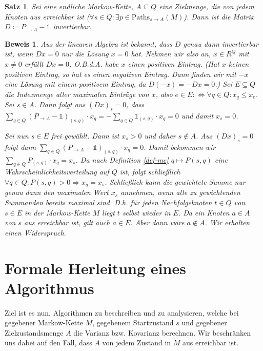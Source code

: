 \documentclass[a4paper]{article}
\newcommand{\mc}{Markow-Kette}
\newtheorem{satz}{Satz}[section] %
\theoremstyle{nonumberplain}
\newtheorem{beweis}{Beweis}
\begin{document}
\begin{satz}\label{th-unique}
	Sei \mcex{} eine endliche \mc, $A\subseteq Q$ eine Zielmenge, die von jedem Knoten aus erreichbar ist ($\forall s\in Q: \exists p \in \mathrm{Paths}_{s\rightarrow A}(M)$). 
	Dann ist die Matrix $D \coloneqq P_{\rightarrow A} - \mathbb{1}$ invertierbar.
\end{satz}
\begin{beweis}
	Aus der linearen Algebra ist bekannt, dass $D$ genau dann invertierbar ist, wenn $Dx = 0$ nur die Lösung $x=0$ hat.
	Nehmen wir also an, $x \in R^Q$ mit $x\neq 0$ erfüllt $Dx = 0$. O.B.d.A. habe $x$ einen positiven Eintrag. (Hat $x$ keinen positiven Eintrag, so hat es einen negativen Eintrag. Dann finden wir mit $-x$ eine Lösung mit einem positivem Eintrag, da $D(-x) = - Dx = 0$.)
	Sei $E \subseteq Q$ die Indexmenge aller maximalen Einträge von $x$, also $e \in E :\Leftrightarrow \forall q \in Q : x_q \leq x_e$.
	Sei $s\in A$. Dann folgt aus $(Dx)_s = 0$, dass $\sum_{q\in Q}{(P_{\rightarrow A}- \mathbb{1})_{(s,q)} \cdot x_q} = -\sum_{q\in Q}{\mathbb{1}_{(s,q)} \cdot x_q} = 0$  und damit $x_s = 0$.
	
	Sei nun $s \in E$ frei gewählt. Dann ist $x_s > 0$ und daher $s\notin A$. Aus $(Dx)_s = 0$ folgt dann $\sum_{q\in Q}{(P_{\rightarrow A}- \mathbb{1})_{(s,q)} \cdot x_q} = 0$. Damit bekommen wir $\sum_{q\in Q}{P_{(s,q)} \cdot x_q} = x_s$. Da nach Definition \ref{def-mc} $q \mapsto P(s,q)$ eine Wahrscheinlichkeitsverteilung auf $Q$ ist, folgt schließlich $\forall q\in Q: P(s,q) > 0 \Rightarrow x_q = x_s$. Schließlich kann die gewichtete Summe nur genau dann den maximalen Wert $x_s$ annehmen, wenn alle zu gewichtenden Summanden bereits maximal sind. D.h. für jeden Nachfolgeknoten $t\in Q$ von $s\in E$ in der \mc{} $M$ liegt $t$ selbst wieder in $E$. Da ein Knoten $a\in A$ von $s$ aus erreichbar ist, gilt auch $a\in E$. Aber dann wäre $a\notin A$. Wir erhalten einen Widerspruch.
\end{beweis}


\section{Formale Herleitung eines Algorithmus}

Ziel ist es nun, Algorithmen zu beschreiben und zu analysieren, welche bei gegebener \mc{} $M$, gegebenem Startzustand $s$ und gegebener Zielzustandsmenge $A$ die Varianz bzw. Kovarianz berechnen. Wir beschränken uns dabei auf den Fall, dass $A$ von jedem Zustand in $M$ aus erreichbar ist.
\end{document}
